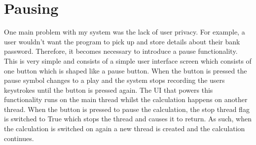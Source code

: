 \documentclass[10pt,a4paper]{report}
\begin{document}
\section{Pausing}

One main problem with my system was the lack of user privacy. For example, a user wouldn't want the program to pick up and store details about their bank password. Therefore, it becomes necessary to introduce a pause functionality. This is very simple and consists of a simple user interface screen which consists of one button which is shaped like a pause button. When the button is pressed the pause symbol changes to a play and the system stops recording the users keystrokes until the button is pressed again. The UI that powers this functionality runs on the main thread whilst the calculation happens on another thread. When the button is pressed to pause the calculation, the stop thread flag is switched to True which stops the thread and causes it to return. As such, when the calculation is switched on again a new thread is created and the calculation continues.
\end{document}
